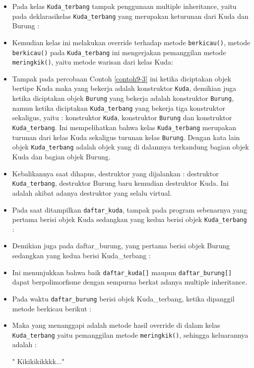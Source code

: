 \begin{itemize}
\item
 Pada kelas \texttt{Kuda\_terbang} tampak penggunaan multiple
 inheritance, yaitu pada deklarasikelas \texttt{Kuda\_terbang} yang
 merupakan keturunan dari Kuda dan Burung :


\item
 Kemudian kelas ini melakukan override terhadap metode
 \texttt{berkicau()}, metode \texttt{berkicau()} pada
 \texttt{Kuda\_terbang} ini mengerjakan pemanggilan metode
 \texttt{meringkik()}, yaitu metode warisan dari kelas Kuda:


\item
 Tampak pada percobaan Contoh \ref{contoh9-3} ini ketika diciptakan objek bertipe
 Kuda maka yang bekerja adalah konstruktor \texttt{Kuda}, demikian juga
 ketika diciptakan objek \texttt{Burung} yang bekerja adalah
 konstruktor \texttt{Burung}, namun ketika diciptakan
 \texttt{Kuda\_terbang} yang bekerja tiga konstruktor sekaligus, yaitu
 : konstruktor \texttt{Kuda}, konstruktor \texttt{Burung} dan
 konstruktor \texttt{Kuda\_terbang}. Ini mempelihatkan bahwa kelas
 \texttt{Kuda\_terbang} merupakan turunan dari kelas Kuda sekaligus
 turunan kelas \texttt{Burung}. Dengan kata lain objek
 \texttt{Kuda\_terbang} adalah objek yang di dalamnya terkandung bagian
 objek Kuda dan bagian objek Burung.
\item
 Kebalikannya saat dihapus, destruktor yang dijalankan : destruktor
 \texttt{Kuda\_terbang}, destruktor Burung baru kemudian destruktor
 Kuda. Ini adalah akibat adanya destruktor yang selalu virtual.
\item
 Pada saat ditampilkan \texttt{daftar\_kuda}, tampak pada program
 sebenarnya yang pertama berisi objek Kuda sedangkan yang kedua berisi
 objek \texttt{Kuda\_terbang} :


\item
 Demikian juga pada daftar\_burung, yang pertama berisi objek Burung
 sedangkan yang kedua berisi Kuda\_terbang :


\item
 Ini menunjukkan bahwa baik \texttt{daftar\_kuda{[}{]}} maupun
 \texttt{daftar\_burung{[}{]}} dapat berpolimorfisme dengan sempurna
 berkat adanya multiple inheritance.
\item
 Pada waktu \texttt{daftar\_burung} berisi objek Kuda\_terbang, ketika
 dipanggil metode berkicau berikut :


\item
 Maka yang menanggapi adalah metode hasil override di dalam kelas
 \texttt{Kuda\_terbang} yaitu pemanggilan metode \texttt{meringkik()},
 sehingga keluarannya adalah :

\begin{lcverbatim}
" Kikikikikkkk..."
\end{lcverbatim}
\end{itemize}

